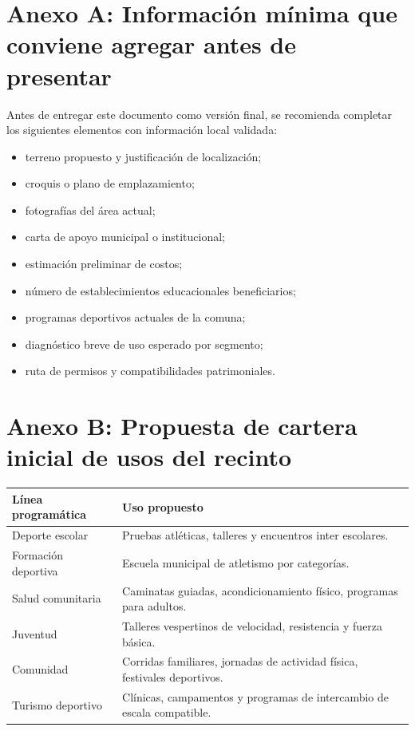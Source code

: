 \documentclass[12pt,letterpaper]{article}
\begin{document}
\newpage
\section*{Anexo A: Información mínima que conviene agregar antes de presentar}

Antes de entregar este documento como versión final, se recomienda completar los siguientes elementos con información local validada:

\begin{itemize}
    \item terreno propuesto y justificación de localización;
    \item croquis o plano de emplazamiento;
    \item fotografías del área actual;
    \item carta de apoyo municipal o institucional;
    \item estimación preliminar de costos;
    \item número de establecimientos educacionales beneficiarios;
    \item programas deportivos actuales de la comuna;
    \item diagnóstico breve de uso esperado por segmento;
    \item ruta de permisos y compatibilidades patrimoniales.
\end{itemize}

\section*{Anexo B: Propuesta de cartera inicial de usos del recinto}

\begin{longtable}{p{5cm}p{9cm}}
\toprule
\textbf{Línea programática} & \textbf{Uso propuesto} \\
\midrule
Deporte escolar & Pruebas atléticas, talleres y encuentros inter escolares. \\
Formación deportiva & Escuela municipal de atletismo por categorías. \\
Salud comunitaria & Caminatas guiadas, acondicionamiento físico, programas para adultos. \\
Juventud & Talleres vespertinos de velocidad, resistencia y fuerza básica. \\
Comunidad & Corridas familiares, jornadas de actividad física, festivales deportivos. \\
Turismo deportivo & Clínicas, campamentos y programas de intercambio de escala compatible. \\
\bottomrule
\end{longtable}
\end{document}
